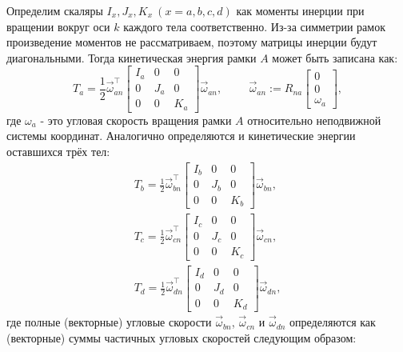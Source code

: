 \documentclass{article}
\begin{document}
Определим скаляры $I_x,J_x,K_x~(x=a,b,c,d)$ как моменты инерции при вращении вокруг оси $k$ каждого тела соответственно.
Из-за симметрии рамок произведение моментов не рассматриваем, поэтому матрицы инерции будут диагональными.
Тогда кинетическая энергия рамки $A$ может быть записана как:
$$
T_a = \frac{1}{2}\vec\omega_{an}^\top \begin{bmatrix}I_a&0&0\\0&J_a&0\\0&0&K_a\end{bmatrix}\vec\omega_{an},\hspace{1cm}
\vec \omega_{an} := R_{na}\begin{bmatrix}0\\0\\\omega_a\end{bmatrix},
$$
где $\omega_a$ - это угловая скорость вращения рамки $A$ относительно неподвижной системы координат.
Аналогично определяются и кинетические энергии оставшихся трёх тел:
\begin{align*}
T_b = \frac{1}{2}\vec\omega_{bn}^\top \begin{bmatrix}I_b&0&0\\0&J_b&0\\0&0&K_b\end{bmatrix}\vec\omega_{bn},\\
T_c = \frac{1}{2}\vec\omega_{cn}^\top \begin{bmatrix}I_c&0&0\\0&J_c&0\\0&0&K_c\end{bmatrix}\vec\omega_{cn},\\
T_d = \frac{1}{2}\vec\omega_{dn}^\top \begin{bmatrix}I_d&0&0\\0&J_d&0\\0&0&K_d\end{bmatrix}\vec\omega_{dn}, 
\end{align*}
где полные (векторные) угловые скорости $\vec\omega_{bn}$, $\vec\omega_{cn}$ и $\vec\omega_{dn}$ определяются как (векторные) суммы частичных угловых скоростей следующим образом:
\end{document}
